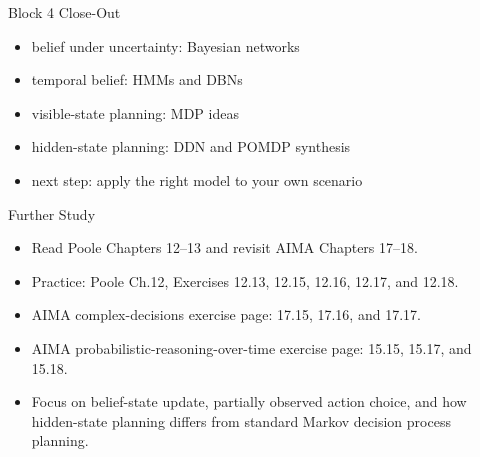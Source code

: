 \documentclass[aspectratio=169]{beamer}
\begin{document}
\begin{frame}{Block 4 Close-Out}
\begin{itemize}
  \item belief under uncertainty: Bayesian networks
  \item temporal belief: HMMs and DBNs
  \item visible-state planning: MDP ideas
  \item hidden-state planning: DDN and POMDP synthesis
  \item next step: apply the right model to your own scenario
\end{itemize}
\end{frame}

\begin{frame}{Further Study}
\begin{itemize}
  \item Read Poole Chapters 12--13 and revisit AIMA Chapters 17--18.
  \item Practice: Poole Ch.12, Exercises 12.13, 12.15, 12.16, 12.17, and 12.18.
  \item AIMA complex-decisions exercise page: 17.15, 17.16, and 17.17.
  \item AIMA probabilistic-reasoning-over-time exercise page: 15.15, 15.17, and 15.18.
  \item Focus on belief-state update, partially observed action choice, and how hidden-state planning differs from standard Markov decision process planning.
\end{itemize}
\end{frame}
\end{document}
